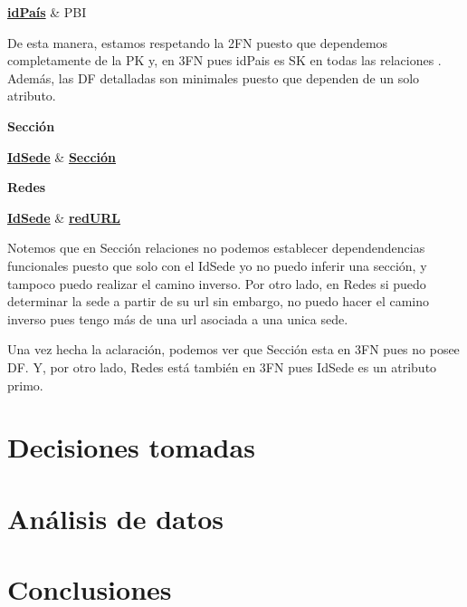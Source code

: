 \documentclass[10pt,a4paper]{article}
\begin{document}
\begin{dependency}
    \raggedright
    \begin{deptext}[TxtBook] %
        \textbf{\underline{idPaís}} \& PBI  \\
    \end{deptext}
\end{dependency} 

De esta manera, estamos respetando la 2FN puesto que dependemos completamente de la PK y, en 3FN pues idPais es SK en todas las relaciones . Además, las DF detalladas son minimales puesto que dependen de un solo atributo.

\vspace{3mm}
\textbf{Sección} 

\begin{dependency}
    \raggedright
    \begin{deptext}[TxtBook] %
        \textbf{\underline{IdSede}}  \& \textbf{\underline{Sección}}  \\
    \end{deptext}
\end{dependency}

\vspace{3mm}
\textbf{Redes} 

\begin{dependency}
    \raggedright
    \begin{deptext}[TxtBook] %
        \textbf{\underline{IdSede}}  \& \textbf{\underline{redURL}}  \\
    \end{deptext}
\end{dependency} \vspace{0.3cm}

Notemos que en Sección relaciones no podemos establecer dependendencias funcionales puesto que solo con el IdSede yo no puedo inferir una sección, y tampoco
puedo realizar el camino inverso. Por otro lado, en Redes si puedo determinar la sede a partir de su url sin embargo, no puedo hacer el camino inverso pues tengo más de
una url asociada a una unica sede.  \par
Una vez hecha la aclaración, podemos ver que Sección esta en 3FN pues no posee DF. Y, por otro lado, Redes está también en 3FN pues IdSede es un atributo primo.

\section{Decisiones tomadas}


\section{Análisis de datos}


\section{Conclusiones}
\end{document}

